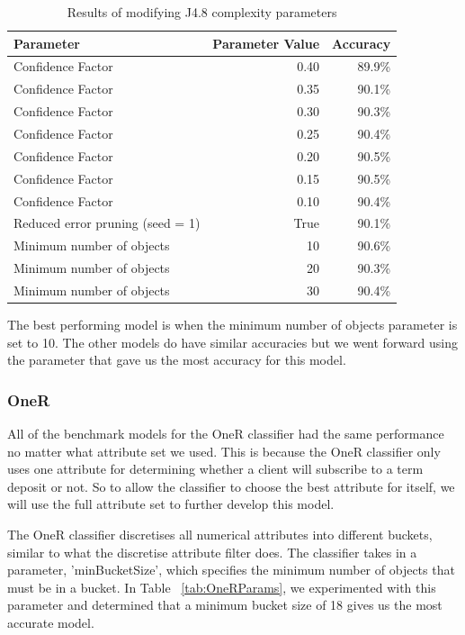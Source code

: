 \documentclass[a4paper,11pt]{article}
\begin{document}
\begin{table}[H]
  \begin{center}
    \begin{tabular}{l | r | r}
      Parameter & Parameter Value & Accuracy  \\ \hline
      Confidence Factor & 0.40 & 89.9\% \\
      Confidence Factor & 0.35 & 90.1\% \\
      Confidence Factor & 0.30 & 90.3\% \\
      Confidence Factor & 0.25 & 90.4\% \\
      Confidence Factor & 0.20 & 90.5\% \\
      Confidence Factor & 0.15 & 90.5\% \\
      Confidence Factor & 0.10 & 90.4\% \\
      Reduced error pruning (seed = 1) & True & 90.1\% \\
      Minimum number of objects  & 10 & 90.6\% \\
      Minimum number of objects  & 20 & 90.3\% \\
      Minimum number of objects  & 30 & 90.4\% \\
    \end{tabular}
  \end{center}
  \caption{Results of modifying J4.8 complexity parameters}
  \label{tab:J48Params}
\end{table}

The best performing model is when the minimum number of objects parameter is set to 10. The other models do have similar
accuracies but we went forward using the parameter that gave us the most accuracy for this model.

\subsubsection{OneR}

All of the benchmark models for the OneR classifier had the same performance no matter what attribute set we used. This
is because the OneR classifier only uses one attribute for determining whether a client will subscribe to a term deposit
or not. So to allow the classifier to choose the best attribute for itself, we will use the full attribute set to
further develop this model.

The OneR classifier discretises all numerical attributes into different buckets, similar to what the discretise 
attribute filter does. The classifier takes in a parameter, 'minBucketSize', which specifies the minimum number of objects 
that must be in a bucket. In Table ~\ref{tab:OneRParams}, we experimented with this parameter and determined that a minimum
bucket size of 18 gives us the most accurate model.
\end{document}
